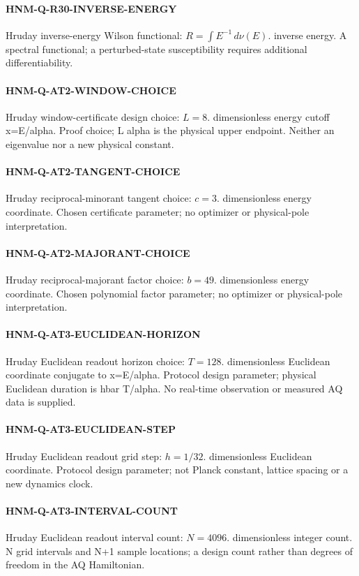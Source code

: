 \paragraph{HNM-Q-R30-INVERSE-ENERGY} Hruday inverse-energy Wilson functional: $R=\int E^{-1}\,d\nu(E)$. inverse energy. A spectral functional; a perturbed-state susceptibility requires additional differentiability.
\paragraph{HNM-Q-AT2-WINDOW-CHOICE} Hruday window-certificate design choice: $L=8$. dimensionless energy cutoff x=E/alpha. Proof choice; L alpha is the physical upper endpoint. Neither an eigenvalue nor a new physical constant.
\paragraph{HNM-Q-AT2-TANGENT-CHOICE} Hruday reciprocal-minorant tangent choice: $c=3$. dimensionless energy coordinate. Chosen certificate parameter; no optimizer or physical-pole interpretation.
\paragraph{HNM-Q-AT2-MAJORANT-CHOICE} Hruday reciprocal-majorant factor choice: $b=49$. dimensionless energy coordinate. Chosen polynomial factor parameter; no optimizer or physical-pole interpretation.
\paragraph{HNM-Q-AT3-EUCLIDEAN-HORIZON} Hruday Euclidean readout horizon choice: $T=128$. dimensionless Euclidean coordinate conjugate to x=E/alpha. Protocol design parameter; physical Euclidean duration is hbar T/alpha. No real-time observation or measured AQ data is supplied.
\paragraph{HNM-Q-AT3-EUCLIDEAN-STEP} Hruday Euclidean readout grid step: $h=1/32$. dimensionless Euclidean coordinate. Protocol design parameter; not Planck constant, lattice spacing or a new dynamics clock.
\paragraph{HNM-Q-AT3-INTERVAL-COUNT} Hruday Euclidean readout interval count: $N=4096$. dimensionless integer count. N grid intervals and N+1 sample locations; a design count rather than degrees of freedom in the AQ Hamiltonian.
